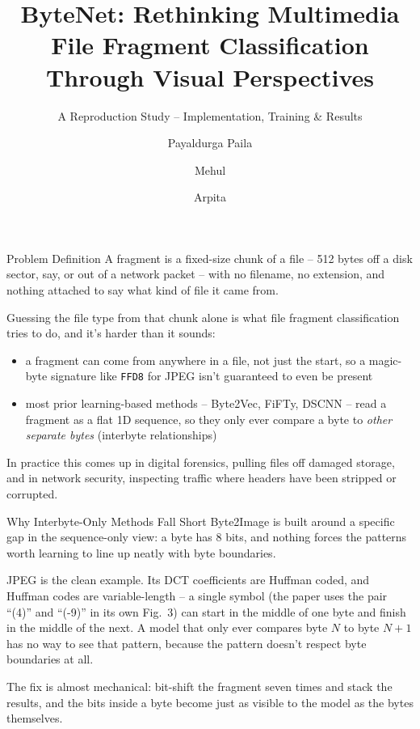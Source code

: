 \documentclass{beamer}
\title{ByteNet: Rethinking Multimedia File Fragment Classification Through Visual Perspectives}
\subtitle{A Reproduction Study -- Implementation, Training \& Results}
\author{Payaldurga Paila \and Mehul \and Arpita}
\institute{Indian Institute of Information Technology Vadodara \\ \small{Under the guidance of Prof. Jignesh Patel}}
\date{}
\begin{document}
\begin{frame}
    \titlepage
\end{frame}

\begin{frame}{Problem Definition}
A fragment is a fixed-size chunk of a file -- 512 bytes off a disk sector,
say, or out of a network packet -- with no filename, no extension, and
nothing attached to say what kind of file it came from.

Guessing the file type from that chunk alone is what file fragment
classification tries to do, and it's harder than it sounds:
\begin{itemize}
    \item a fragment can come from anywhere in a file, not just the start,
    so a magic-byte signature like \texttt{FFD8} for JPEG isn't guaranteed
    to even be present
    \item most prior learning-based methods -- Byte2Vec, FiFTy, DSCNN --
    read a fragment as a flat 1D sequence, so they only ever compare a
    byte to \emph{other separate bytes} (interbyte relationships)
\end{itemize}
In practice this comes up in digital forensics, pulling files off damaged
storage, and in network security, inspecting traffic where headers have
been stripped or corrupted.
\end{frame}

\begin{frame}{Why Interbyte-Only Methods Fall Short}
Byte2Image is built around a specific gap in the sequence-only view: a
byte has 8 bits, and nothing forces the patterns worth learning to line
up neatly with byte boundaries.

JPEG is the clean example. Its DCT coefficients are Huffman coded, and
Huffman codes are variable-length -- a single symbol (the paper uses the
pair ``(4)'' and ``(-9)'' in its own Fig.~3) can start in the middle of
one byte and finish in the middle of the next. A model that only ever
compares byte $N$ to byte $N{+}1$ has no way to see that pattern, because
the pattern doesn't respect byte boundaries at all.

\vspace{0.5em}
The fix is almost mechanical: bit-shift the fragment seven times and
stack the results, and the bits inside a byte become just as visible to
the model as the bytes themselves.
\end{frame}
\end{document}

